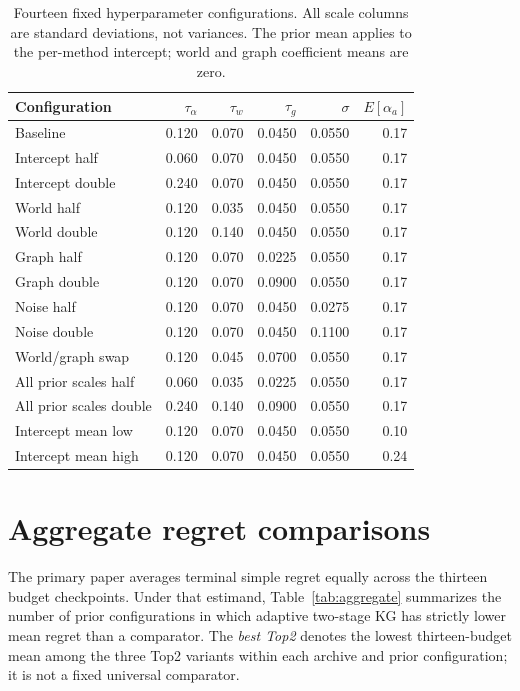 \documentclass[10pt,a4paper]{article}
\begin{document}
\begin{table}[ht]
\centering
\small
\caption{Fourteen fixed hyperparameter configurations. All scale columns
are standard deviations, not variances. The prior mean applies to the
per-method intercept; world and graph coefficient means are zero.}
\label{tab:grid}
\begin{tabular}{lrrrrr}
\toprule
Configuration & $\tau_\alpha$ & $\tau_w$ & $\tau_g$ & $\sigma$ & $E[\alpha_a]$\\
\midrule
Baseline & 0.120 & 0.070 & 0.0450 & 0.0550 & 0.17\\
Intercept half & 0.060 & 0.070 & 0.0450 & 0.0550 & 0.17\\
Intercept double & 0.240 & 0.070 & 0.0450 & 0.0550 & 0.17\\
World half & 0.120 & 0.035 & 0.0450 & 0.0550 & 0.17\\
World double & 0.120 & 0.140 & 0.0450 & 0.0550 & 0.17\\
Graph half & 0.120 & 0.070 & 0.0225 & 0.0550 & 0.17\\
Graph double & 0.120 & 0.070 & 0.0900 & 0.0550 & 0.17\\
Noise half & 0.120 & 0.070 & 0.0450 & 0.0275 & 0.17\\
Noise double & 0.120 & 0.070 & 0.0450 & 0.1100 & 0.17\\
World/graph swap & 0.120 & 0.045 & 0.0700 & 0.0550 & 0.17\\
All prior scales half & 0.060 & 0.035 & 0.0225 & 0.0550 & 0.17\\
All prior scales double & 0.240 & 0.140 & 0.0900 & 0.0550 & 0.17\\
Intercept mean low & 0.120 & 0.070 & 0.0450 & 0.0550 & 0.10\\
Intercept mean high & 0.120 & 0.070 & 0.0450 & 0.0550 & 0.24\\
\bottomrule
\end{tabular}
\end{table}

\section*{Aggregate regret comparisons}
The primary paper averages terminal simple regret equally across the thirteen
budget checkpoints. Under that estimand, Table~\ref{tab:aggregate}
summarizes the number of prior configurations in which adaptive two-stage KG
has strictly lower mean regret than a comparator. The \emph{best Top2}
denotes the lowest thirteen-budget mean among the three Top2 variants
within each archive and prior configuration; it is not a fixed
universal comparator.
\end{document}

